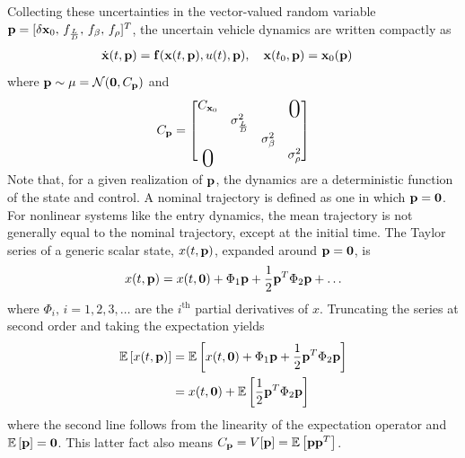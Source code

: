 Collecting these uncertainties in the vector-valued random variable $\mathbf{p} = [\delta\mathbf{x}_0,\, f_{\frac{L}{D}},\, f_{\beta},\, f_{\rho}]^T$, the uncertain vehicle dynamics are written compactly as
\begin{align}
	\dot{\mathbf{x}}(t,\mathbf{p}) &= \mathbf{f}(\mathbf{x}(t,\mathbf{p}), u(t), \mathbf{p}),\quad
		\mathbf{x}(t_0,\mathbf{p}) = \mathbf{x}_0(\mathbf{p}) \label{Eq:UncertainDynamics}
\end{align}
where $\mathbf{p} \sim \mu = \mathcal{N}(\mathbf{0},C_{\mathbf{p}})$ and 
\begin{align}
	\cov_{\param} = \begin{bmatrix}
		\cov_{\state_0} & & &\bigzero \\ 
		 &\sigma^2_{\frac{L}{D}} \\
		 & & \sigma^2_{\beta} \\
		\bigzero & & & \sigma^2_{\rho}
	\end{bmatrix}
\end{align}
Note that, for a given realization of $\mathbf{p}$, the dynamics are a deterministic function of the state and control. A nominal trajectory is defined as one in which $\mathbf{p}=\mathbf{0}$. For nonlinear systems like the entry dynamics, the mean trajectory is not generally equal to the nominal trajectory, except at the initial time. 
The Taylor series of a generic scalar state, $x(t,\mathbf{p})$, expanded around $\mathbf{p}=\mathbf{0}$, is 
\begin{align}
	x(t,\mathbf{p}) = x(t,\mathbf{0}) + \Phi_1\mathbf{p} + \frac{1}{2}\mathbf{p}^T\Phi_2\mathbf{p} + \dots
\end{align} 
where $\Phi_i,\,i=1,2,3,\dots$ are the $i^{\mathrm{th}}$ partial derivatives of $x$. 
Truncating the series at second order and taking the expectation yields
\begin{align}
	\mathbb{E}\left[x(t,\mathbf{p})\right] &= \mathbb{E}\left[x(t,\mathbf{0}) + \Phi_1\mathbf{p} + \frac{1}{2}\mathbf{p}^T\Phi_2\mathbf{p}\right] \\
	 &= x(t,\mathbf{0}) + \mathbb{E}\left[\frac{1}{2}\mathbf{p}^T\Phi_2\mathbf{p}\right]
\end{align}
where the second line follows from the linearity of the expectation operator and $\mathbb{E}\left[\mathbf{p}\right] = \mathbf{0}$. This latter fact also means $C_{\mathbf{p}} = V[\mathbf{p}] = \mathbb{E}\left[\mathbf{p}\mathbf{p}^T\right]$. 

